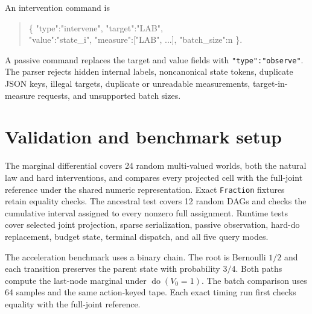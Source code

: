 \documentclass{article}
\newcommand{\doop}{\operatorname{do}}
\begin{document}
An intervention command is
\begin{quote}\small\ttfamily\raggedright
\{ "type":"intervene", "target":"LAB",\\
"value":"state\_i", "measure":["LAB", ...], "batch\_size":n \}.
\end{quote}
A passive command replaces the target and value fields with
\texttt{"type":"observe"}. The parser rejects hidden internal labels,
noncanonical state tokens, duplicate JSON keys, illegal targets, duplicate or
unreadable measurements, target-in-measure requests, and unsupported batch sizes.

\section{Validation and benchmark setup}

The marginal differential covers 24 random multi-valued worlds, both the natural
law and hard interventions, and compares every projected cell with the full-joint
reference under the shared numeric representation. Exact \texttt{Fraction}
fixtures retain equality checks. The ancestral test covers 12 random DAGs and checks the
cumulative interval assigned to every nonzero full assignment. Runtime tests cover
selected joint projection, sparse serialization, passive observation, hard-do
replacement, budget state, terminal dispatch, and all five query modes.

The acceleration benchmark uses a binary chain. The root is Bernoulli $1/2$ and
each transition preserves the parent state with probability $3/4$. Both paths
compute the last-node marginal under $\doop(V_0=1)$. The batch comparison uses 64
samples and the same action-keyed tape. Each exact timing run first checks equality
with the full-joint reference.
\end{document}
